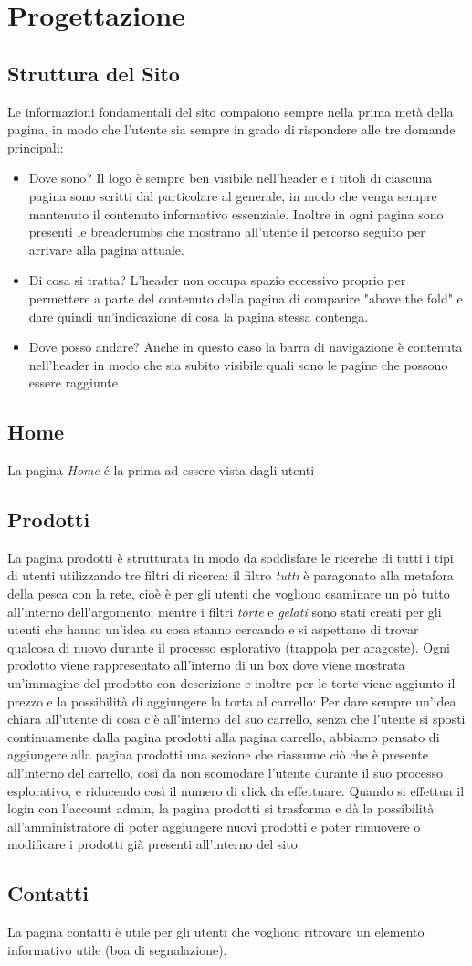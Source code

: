 \section{Progettazione}
    \subsection{Struttura del Sito}
		Le informazioni fondamentali del sito compaiono sempre nella prima metà della pagina, in modo che l'utente sia sempre in grado di rispondere alle tre domande principali:
		\begin{itemize}
			\item Dove sono? Il logo è sempre ben visibile nell'header e i titoli di ciascuna pagina sono scritti dal particolare al generale, in modo che venga sempre mantenuto il contenuto informativo essenziale. Inoltre in ogni pagina sono presenti le breadcrumbs che mostrano all'utente il percorso seguito per arrivare alla pagina attuale.
			\item Di cosa si tratta? L'header non occupa spazio eccessivo proprio per permettere a parte del contenuto della pagina di comparire "above the fold" e dare quindi un'indicazione di cosa la pagina stessa contenga.
			\item Dove posso andare? Anche in questo caso la barra di navigazione è contenuta nell'header in modo che sia subito visibile quali sono le pagine che possono essere raggiunte
		\end{itemize}
    \subsection{Home}
		La pagina \emph{Home} \'e la prima ad essere vista dagli utenti
    \subsection{Prodotti}
		La pagina prodotti è strutturata in modo da soddisfare le ricerche di tutti i tipi di utenti utilizzando tre filtri di ricerca:
		il filtro \emph{tutti} è paragonato alla metafora della pesca con la rete, cioè è per gli utenti che vogliono esaminare un pò tutto all’interno dell’argomento;
		mentre i filtri \emph{torte} e \emph{gelati}  sono stati creati per gli utenti che hanno un’idea su cosa stanno cercando e si aspettano di trovar qualcosa di nuovo durante il processo esplorativo (trappola per aragoste).
		Ogni prodotto viene rappresentato all’interno di un box dove viene mostrata un’immagine del prodotto con descrizione e inoltre per le torte viene aggiunto il prezzo e la possibilità di aggiungere la torta al carrello:
		Per dare sempre un’idea chiara all’utente di cosa c’è all’interno del suo carrello, senza che l’utente si sposti continuamente dalla pagina prodotti alla pagina carrello, abbiamo pensato di aggiungere alla pagina prodotti una sezione che riassume ciò che è presente all’interno del carrello, così da non scomodare l’utente durante il suo processo esplorativo, e riducendo così il numero di click da effettuare.
		Quando si effettua il login con l'account admin, la pagina prodotti si trasforma e dà la possibilità all’amministratore di poter aggiungere nuovi prodotti e poter rimuovere o modificare i prodotti già presenti all’interno del sito.
    \subsection{Contatti}
		La pagina contatti è utile per gli utenti che vogliono ritrovare un elemento informativo utile (boa di segnalazione).
